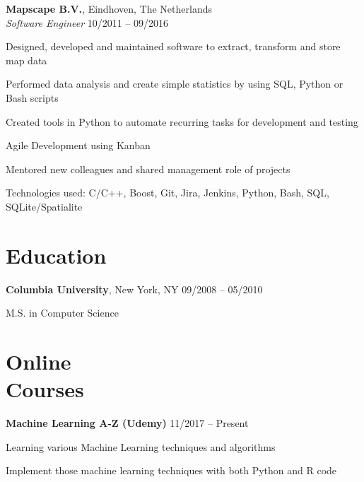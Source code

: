 \documentclass[margin,line]{resume}
\begin{document}
\begin{resume}
    \textbf{Mapscape B.V.}, Eindhoven, The Netherlands \\
    \textsl{Software Engineer} \hfill 10/2011 -- 09/2016 \vspace{-3mm}\\\vspace{-1mm}%
      \begin{list2}
      \item Designed, developed and maintained software to extract, transform and store map data
      \item Performed data analysis and create simple statistics by using SQL, Python or Bash scripts
      \item Created tools in Python to automate recurring tasks for development and testing
      \item Agile Development using Kanban
      \item Mentored new colleagues and shared management role of projects
      \item Technologies used: C/C++, Boost, Git, Jira, Jenkins, Python, Bash, SQL, SQLite/Spatialite
      \end{list2}

    \section{\myheadingstyle Education}

    \textbf{Columbia University}, New York, NY \hfill 09/2008 -- 05/2010 \vspace{-3mm}\\\vspace{-1mm}%
      \begin{list2}
       \item M.S. in Computer Science
      \end{list2}
    \vspace{-1mm}
 
    \newpage
    \section{\myheadingstyle Online \\ Courses}

    \textbf{Machine Learning A-Z (Udemy)} \hfill 11/2017 -- Present \vspace{-3mm}\\\vspace{-1mm}%
      \begin{list2}
       \item Learning various Machine Learning techniques and algorithms
       \item Implement those machine learning techniques with both Python and R code
      \end{list2}
    \vspace{-2mm}


\end{resume}
\end{document}
